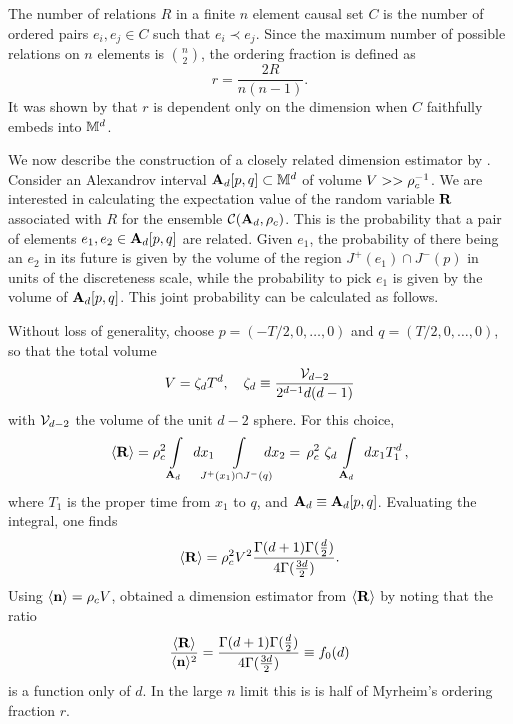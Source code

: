 The {number of relations}  $R$ in a finite $n$ element causal set $C$ is the number
of ordered 
pairs $e_i, e_j \in C$ such that $e_i \prec e_j$.  Since the maximum number of possible  relations on $n$ elements  is
$\binom{n}{2}$,  the  {ordering fraction} is defined as 
\begin{equation} 
r =\frac{2R}{n(n-1)}. 
\end{equation}
It was shown by \cite{myrheim}  that $r$ is dependent only on the dimension
when $C$ faithfully embeds into $\mathbb M^d$.    

We now describe the construction of a closely related dimension estimator by \cite{meyer}. Consider an Alexandrov interval $\mathbf A_d[p,q] \subset \mathbb M^d$ of volume $V>> \rho_c^{-1}$.   
We are interested in calculating the expectation value of the random variable $\mathbf R$ associated with $R$ for the ensemble
$\mathcal C(\mathbf A_d,\rho_c)$.  This is the probability that a pair of elements $e_1,e_2 \in \mathbf A_d[p,q]$ are related.    Given $e_1$, the
probability of  there being an $e_2$ in its future is given by the volume of the region $J^+(e_1) \cap J^-(p)$
in units of the discreteness scale, while the probability to pick $e_1$  is
given by the volume of $\mathbf A_d[p,q]$. This joint probability can be calculated as follows. 


Without loss of generality, choose  $p=(-T/2,0,\ldots, 0)$ and
$q=(T/2, 0, \ldots, 0)$, so that the total volume
\begin{equation}
  V = \zeta_d T^d,  \quad  \zeta_d \equiv \frac{\mathcal{V}_{d-2}}{2^{d-1} d(d-1)}
  \label{eq:zetad} 
\end{equation} 
 with  $\mathcal{V}_{d-2}$  the volume of the unit ${d-2}$ sphere. 
For this choice,  
 \begin{equation} 
   \av{\bR} = \rc^2 \int\limits_{\Alex_d}\,\,\,  dx_1 \negs \negs\int\limits_{J^+(x_1) \cap J^-(q)}\negs\negs dx_2  =\,
   \rc^2 \, \,  \zeta_d \,  \int\limits_{\Alex_d}\,\,dx_1 T_1^d \,,
\end{equation} 
where $T_1$ is the proper time from $x_1$ to $q$, and $\mathbf A_d \equiv\mathbf A_d[p,q]$. Evaluating the integral, one finds 
\begin{equation} 
\label{ctwoflat} 
 \langle {\mathbf R} \rangle = \rho_c^2 V^2 \frac{\Gamma(d+1) \Gamma(\frac{d}{2})}{4 \Gamma(\frac{3d}{2})}. 
\end{equation}
Using $\langle {\mathbf n} \rangle = \rho_c V$,  \cite{meyer} obtained a dimension estimator from $\langle {\mathbf R} \rangle$ by noting that the ratio
\begin{equation} 
\label{eq:dimension} 
\frac{\langle {\mathbf R} \rangle}{\langle {\mathbf n} \rangle^2} = \frac{\Gamma(d+1) \Gamma(\frac{d}{2})}{4 \Gamma(\frac{3d}{2})} \equiv { f}_0(d) 
\end{equation} 
is a function only of $d$. In  the large $n$ limit 
this is is half of Myrheim's ordering fraction $r$. 


